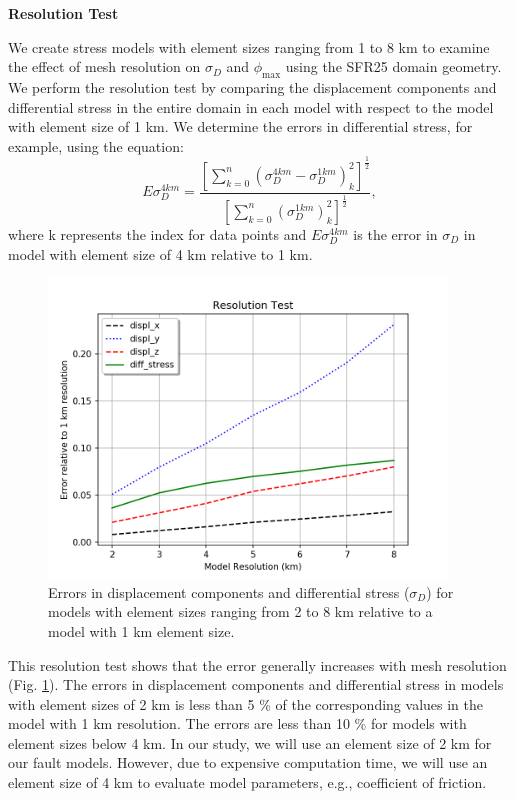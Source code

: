 \documentclass[draft,jgrga]{agutexSI2019}
\begin{document}
\begin{article}
\noindent\textbf{Resolution Test}

We create stress models with element sizes ranging from 1 to 8 km to examine the effect of mesh resolution on $\sigma_{D}$ and $\phi_{\max}$ using the SFR25 domain geometry. We perform the resolution test by comparing the displacement components and differential stress in the entire domain in each model with respect to the model with element size of 1 km. We determine the errors in differential stress, for example, using the equation:
%
\[
 E\sigma_{D}^{4km} = \frac{[\sum_{k=0}^n (\sigma_{D}^{4km} - \sigma_{D}^{1km})_{k}^2]^\frac{1}{2}}
{[\sum_{k=0}^n (\sigma_{D}^{1km})_{k}^2]^\frac{1}{2}},
\]
%
where k represents the index for data points and $ E\sigma_{D}^{4km} $ is the error in $\sigma_{D}$ in model with element size of 4 km relative to 1 km.


\vspace{5mm} %

\begin{figure}
\includegraphics[width=25pc]{Figures/res_test_CSZ.png}
\caption{Errors in displacement components and differential stress ($\sigma_{D}$) for models with element sizes ranging from 2 to 8 km relative to a model with 1 km element size.}
\label{S1}
\end{figure}

\vspace{10mm} %

This resolution test shows that the error generally increases with mesh resolution (Fig. \ref{S1}). %
The errors in displacement components and differential stress in models with element sizes of 2 km is less than 5 \% of the corresponding values in the model with 1 km resolution. The errors are less than 10 \% for models with element sizes below 4 km. In our study, we will use an element size of 2 km for our fault models. However, due to expensive computation time, we will use an element size of 4 km to evaluate model parameters, e.g., coefficient of friction.


\end{article}
\end{document}
